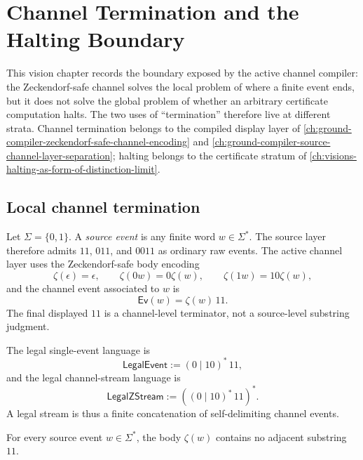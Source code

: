 \chapter{Channel Termination and the Halting Boundary}
\label{ch:visions-channel-termination-vs-halting-boundary}

This vision chapter records the boundary exposed by the active channel
compiler: the Zeckendorf-safe channel solves the local problem of where a
finite event ends, but it does not solve the global problem of whether an
arbitrary certificate computation halts. The two uses of ``termination''
therefore live at different strata. Channel termination belongs to the
compiled display layer of
\autoref{ch:ground-compiler-zeckendorf-safe-channel-encoding} and
\autoref{ch:ground-compiler-source-channel-layer-separation}; halting belongs
to the certificate stratum of
\autoref{ch:visions-halting-as-form-of-distinction-limit}.

\section{Local channel termination}
\label{sec:visions-channel-local-termination}

\begin{definition}
\label{def:visions-source-event-channel-event}
Let $\Sigma=\{0,1\}$. A \emph{source event} is any finite word
$w\in\Sigma^{*}$. The source layer therefore admits $11$, $011$, and
$0011$ as ordinary raw events. The active channel layer uses the
Zeckendorf-safe body encoding
$$
\zeta(\epsilon)=\epsilon,
\qquad
\zeta(0w)=0\zeta(w),
\qquad
\zeta(1w)=10\zeta(w),
$$
and the channel event associated to $w$ is
$$
\mathsf{Ev}(w)=\zeta(w)\,11.
$$
The final displayed $11$ is a channel-level terminator, not a
source-level substring judgment.
\end{definition}

\begin{definition}
\label{def:visions-legal-channel-event-stream}
The legal single-event language is
$$
\mathsf{LegalEvent}:=(0\mid 10)^{*}\,11,
$$
and the legal channel-stream language is
$$
\mathsf{LegalZStream}:=((0\mid 10)^{*}\,11)^{*}.
$$
A legal stream is thus a finite concatenation of self-delimiting channel
events.
\end{definition}

\begin{theorem}
\label{thm:visions-channel-body-no-terminator-pattern}
For every source event $w\in\Sigma^{*}$, the body $\zeta(w)$ contains no
adjacent substring $11$.
\end{theorem}

